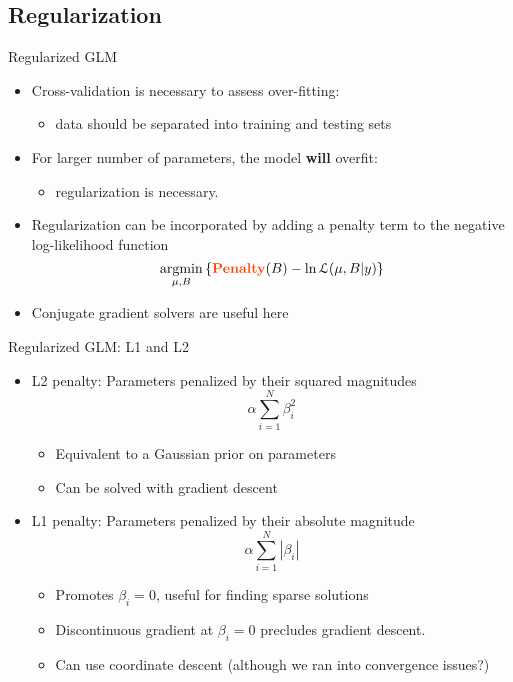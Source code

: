 \documentclass[svgnames,13pt,handout]{beamer}
\DeclareRobustCommand{\emph}[1]{\textbf{{\color{emphasizecolor} #1}}}
\newcommand{\argmin}{\operatornamewithlimits{argmin}}
\begin{document}
\subsection{Regularization}

\begin{frame}{Regularized GLM }
\begin{itemize}
	\item <1->Cross-validation is necessary to assess over-fitting: 
	\begin{itemize}
		\item data should be separated into training and testing sets
		\end{itemize}
	\item <2->For larger number of parameters, the model \emph{will} overfit:
	\begin{itemize}
		\item regularization is necessary. 
		\end{itemize}
	\item <3->Regularization can be incorporated by adding a penalty term to the negative log-likelihood function \[\argmin_{\mu,B}\left\{ \textrm{\emph{Penalty}}(B) - \ln\mathcal{L}(\mu,B|y) \right\}\]
	\item <4->Conjugate gradient solvers are useful here
\end{itemize}
\end{frame} 

\begin{frame}{Regularized GLM: L1 and L2}
\begin{itemize}
	\item <1->L2 penalty: Parameters penalized by their squared magnitudes\[  \alpha \sum_{i=1}^N \beta_i^2 \]
	\begin{itemize}
		\item <2->Equivalent to a Gaussian prior on parameters
		\item <3->Can be solved with gradient descent
		\end{itemize}
	\item <4->L1 penalty: Parameters penalized by their absolute magnitude\[ \alpha \sum_{i=1}^N |\beta_i| \]
	\begin{itemize}
		\item <5->Promotes $\beta_i=0$, useful for finding sparse solutions
		\item <6->Discontinuous gradient at $\beta_i=0$ precludes gradient descent. 
		\item <7->Can use coordinate descent (although we ran into convergence issues?)
	\end{itemize}
\end{itemize}
\end{frame} 
\end{document}
